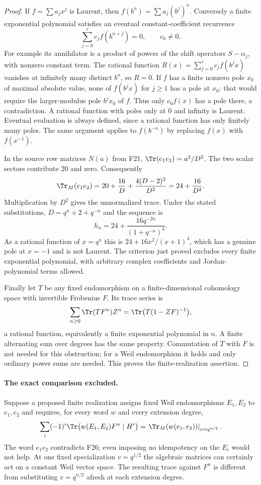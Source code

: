 \documentclass[11pt,a4paper]{article}
\newcommand{\fid}[1]{\textsf{#1}}\newcommand{\gate}[1]{\textsf{#1}}
\theoremstyle{named}\newtheorem{finding}{Finding}[section]
\theoremstyle{definition}\newtheorem{definition}[finding]{Definition}
\theoremstyle{remark}\newtheorem{remark}[finding]{Remark}
\begin{document}
\begin{proof}
If $f=\sum a_jx^j$ is Laurent, then $f(b^n)=\sum a_j(b^j)^n$.
Conversely a finite exponential polynomial satisfies an eventual
constant-coefficient recurrence
\[
 \sum_{j=0}^r c_j f(b^{n+j})=0,\qquad c_0\ne0.
\]
For example its annihilator is a product of powers of the shift
operators $S-\alpha_j$, with nonzero constant term. The rational
function $R(x)=\sum_{j=0}^r c_j f(b^jx)$ vanishes at infinitely many
distinct $b^n$, so $R=0$. If $f$ has a finite nonzero pole $x_0$ of
maximal absolute value, none of $f(b^jx)$ for $j\ge1$ has a pole at
$x_0$: that would require the larger-modulus pole $b^jx_0$ of $f$.
Thus only $c_0f(x)$ has a pole there, a contradiction. A rational
function with poles only at $0$ and infinity is Laurent. Eventual
evaluation is always defined, since a rational function has only
finitely many poles. The same argument applies to $f(b^{-n})$ by
replacing $f(x)$ with $f(x^{-1})$.

In the source row matrices $N(a)$ from \fid{F21},
$\Tr(e_1e_2)=a^2/D^2$. The two scalar sectors contribute $20$ and zero.
Consequently
\[
 \Tr_M(e_1e_2)
 =20+\frac{16}{D}+\frac{4(D-2)^2}{D^2}
 =24+\frac{16}{D^2}.
\]
Multiplication by $D^2$ gives the unnormalized trace. Under the stated
substitutions, $D=q^n+2+q^{-n}$ and the sequence is
\[
 h_n=24+\frac{16q^{-2n}}{(1+q^{-n})^4}.
\]
As a rational function of $x=q^n$ this is
$24+16x^2/(x+1)^4$, which has a genuine pole at $x=-1$ and is not
Laurent. The criterion just proved excludes every finite exponential
polynomial, with arbitrary complex coefficients and Jordan-polynomial
terms allowed.

Finally let $T$ be any fixed endomorphism on a finite-dimensional
cohomology space with invertible Frobenius $F$. Its trace series is
\[
 \sum_{n\ge0}\Tr(TF^n)Z^n
 =\Tr\bigl(T(1-ZF)^{-1}\bigr),
\]
a rational function, equivalently a finite exponential polynomial in
$n$. A finite alternating sum over degrees has the same property.
Commutation of $T$ with $F$ is not needed for this obstruction; for a
Weil endomorphism it holds and only ordinary power sums are needed.
This proves the finite-realization assertion.
\end{proof}

\paragraph{The exact comparison excluded.}
Suppose a proposed finite realization assigns fixed Weil endomorphisms
$E_1,E_2$ to $e_1,e_2$ and requires, for every word $w$ and every
extension degree,
\[
 \sum_i(-1)^i\Tr\bigl(w(E_1,E_2)F^n\mid H^i\bigr)
 =\left.\Tr_M(w(e_1,e_2))\right|_{v=q^{n/2}}.
\]
The word $e_1e_2$ contradicts \fid{F26}; even imposing no idempotency
on the $E_i$ would not help. At one fixed specialization
$v=q^{1/2}$ the algebraic matrices can certainly act on a constant
Weil vector space. The resulting trace against $F^n$ is different
from substituting $v=q^{n/2}$ afresh at each extension degree.
\end{document}
